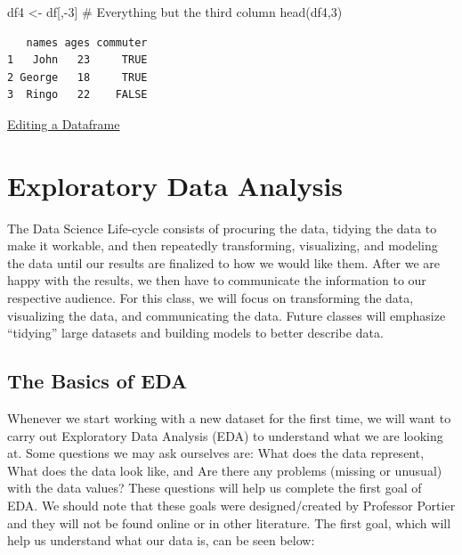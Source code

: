 \documentclass[
  letterpaper,
  DIV=11,
  numbers=noendperiod]{scrreprt}
\newenvironment{Shaded}{\begin{snugshade}}{\end{snugshade}}
\newcommand{\CommentTok}[1]{\textcolor[rgb]{0.37,0.37,0.37}{#1}}
\newcommand{\DecValTok}[1]{\textcolor[rgb]{0.68,0.00,0.00}{#1}}
\newcommand{\FunctionTok}[1]{\textcolor[rgb]{0.28,0.35,0.67}{#1}}
\newcommand{\NormalTok}[1]{\textcolor[rgb]{0.00,0.23,0.31}{#1}}
\newcommand{\OtherTok}[1]{\textcolor[rgb]{0.00,0.23,0.31}{#1}}
\newcommand{\SpecialCharTok}[1]{\textcolor[rgb]{0.37,0.37,0.37}{#1}}
\begin{document}
\begin{Shaded}
\begin{Highlighting}[]
\NormalTok{df4 }\OtherTok{\textless{}{-}}\NormalTok{ df[,}\SpecialCharTok{{-}}\DecValTok{3}\NormalTok{] }\CommentTok{\# Everything but the third column}
\FunctionTok{head}\NormalTok{(df4,}\DecValTok{3}\NormalTok{)}
\end{Highlighting}
\end{Shaded}

\begin{verbatim}
   names ages commuter
1   John   23     TRUE
2 George   18     TRUE
3  Ringo   22    FALSE
\end{verbatim}

\begin{watch}{}{}
    \href{https://youtu.be/us5M1ekgwUE}{Editing a Dataframe}
\end{watch}


\chapter{Exploratory Data Analysis}\label{exploratory-data-analysis}

The Data Science Life-cycle consists of procuring the data, tidying the
data to make it workable, and then repeatedly transforming, visualizing,
and modeling the data until our results are finalized to how we would
like them. After we are happy with the results, we then have to
communicate the information to our respective audience. For this class,
we will focus on transforming the data, visualizing the data, and
communicating the data. Future classes will emphasize ``tidying'' large
datasets and building models to better describe data.

\section{The Basics of EDA}\label{the-basics-of-eda}

Whenever we start working with a new dataset for the first time, we will
want to carry out Exploratory Data Analysis (EDA) to understand what we
are looking at. Some questions we may ask ourselves are: What does the
data represent, What does the data look like, and Are there any problems
(missing or unusual) with the data values? These questions will help us
complete the first goal of EDA. We should note that these goals were
designed/created by Professor Portier and they will not be found online
or in other literature. The first goal, which will help us understand
what our data is, can be seen below:
\end{document}
